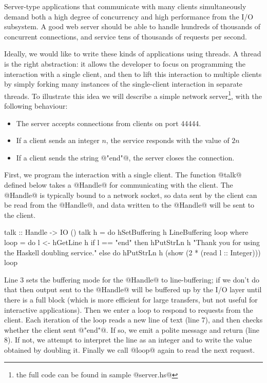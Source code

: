 
Server-type applications that communicate with many clients
simultaneously demand both a high degree of concurrency and high
performance from the I/O subsystem.  A good web server should be able
to handle hundreds of thousands of concurrent connections, and service
tens of thousands of requests per second.

Ideally, we would like to write these kinds of applications using
threads.  A thread is the right abstraction: it allows the developer
to focus on programming the interaction with a single client, and then
to lift this interaction to multiple clients by simply forking many
instances of the single-client interaction in separate threads.  To
illustrate this idea we will describe a simple network
server\footnote{the full code can be found in sample @server.hs@},
with the following behaviour:

\begin{itemize}
\item The server accepts connections from clients on port 44444.
\item If a client sends an integer $n$, the service responds with the value of
  $2n$
\item If a client sends the string @"end"@, the server closes the
  connection.
\end{itemize}

First, we program the interaction with a single client.  The function
@talk@ defined below takes a @Handle@ for communicating with the
client.  The @Handle@ is typically bound to a network socket, so data
sent by the client can be read from the @Handle@, and data written to
the @Handle@ will be sent to the client.

\begin{numhaskell}
talk :: Handle -> IO ()
talk h = do
  hSetBuffering h LineBuffering
  loop
 where
  loop = do
    l <- hGetLine h
    if l == "end"
       then hPutStrLn h "Thank you for using the Haskell doubling service."
       else do hPutStrLn h (show (2 * (read l :: Integer)))
               loop
\end{numhaskell}

\noindent Line 3 sets the buffering mode for the @Handle@ to
line-buffering; if we don't do that then output sent to the @Handle@
will be buffered up by the I/O layer until there is a full block
(which is more efficient for large transfers, but not useful for
interactive applications).  Then we enter a loop to respond to
requests from the client.  Each iteration of the loop reads a new line
of text (line 7), and then checks whether the client sent @"end"@.  If
so, we emit a polite message and return (line 8).  If not, we attempt
to interpret the line as an integer and to write the value obtained by
doubling it.  Finally we call @loop@ again to read the next request.


